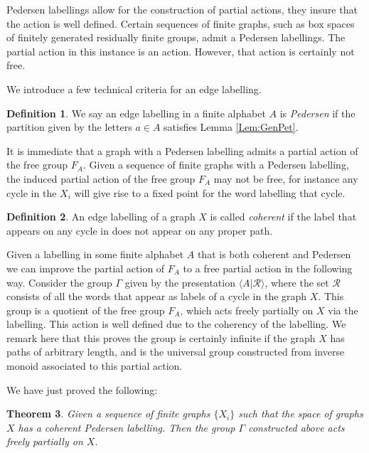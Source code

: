 \documentclass[11pt,a4paper]{amsart}
\theoremstyle{plain}
\newtheorem{theorem}{Theorem}%
\theoremstyle{definition}%
\newtheorem{definition}[theorem]{Definition}%
\theoremstyle{remark}%
\begin{document}
Pedersen labellings allow for the construction of partial actions, they insure that the action is well defined. Certain sequences of finite graphs, such as box spaces of finitely generated residually finite groups, admit a Pedersen labellings. The partial action in this instance is an action. However, that action is certainly not free.

We introduce a few technical criteria for an edge labelling.

\begin{definition}
We say an edge labelling in a finite alphabet $A$ is \textit{Pedersen} if the partition given by the letters $a \in A$ satisfies Lemma \ref{Lem:GenPet}.
\end{definition}

It is immediate that a graph with a Pedersen labelling admits a partial action of the free group $F_{A}$. Given a sequence of finite graphs with a Pedersen labelling, the induced partial action of the free group $F_{A}$ may not be free, for instance any cycle in the $X_{i}$ will give rise to a fixed point for the word labelling that cycle.

\begin{definition}
An edge labelling of a graph $X$ is called \textit{coherent} if the label that appears on any cycle in does not appear on any proper path.
\end{definition}

Given a labelling in some finite alphabet $A$ that is both coherent and Pedersen  we can improve the partial action of $F_{A}$ to a free partial action in the following way. Consider the group $\Gamma$ given by the presentation $\langle A | \mathcal{R} \rangle$, where the set $\mathcal{R}$ consists of all the words that appear as labels of a cycle in the graph $X$. This group is a quotient of the free group $F_{A}$, which acts freely partially on $X$ via the labelling. This action is well defined due to the coherency of the labelling. We remark here that this proves the group is certainly infinite if the graph $X$ has paths of arbitrary length, and is the universal group constructed from inverse monoid associated to this partial action.

We have just proved the following:

\begin{theorem}
Given a sequence of finite graphs $\lbrace X_{i} \rbrace$ such that the space of graphs $X$ has a coherent Pedersen labelling. Then the group $\Gamma$ constructed above acts freely partially on $X$.
\end{theorem}
\end{document}
